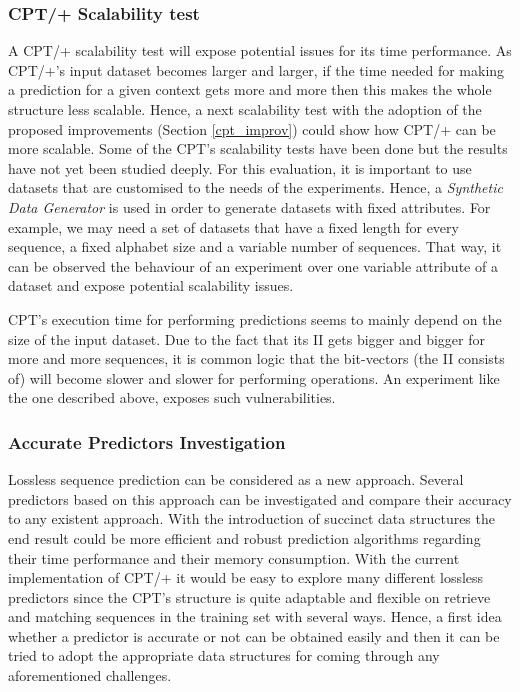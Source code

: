 \subsubsection{CPT/+ Scalability test}
A CPT/+ scalability test will expose potential issues for its time performance. As CPT/+'s input dataset becomes larger and larger, if the time needed for making a prediction for a given context gets more and more then this makes the whole structure less scalable. Hence, a next scalability test with the adoption of the proposed improvements (Section \ref{cpt_improv}) could show how CPT/+ can be more scalable. Some of the CPT's scalability tests have been done but the results have not yet been studied deeply. For this evaluation, it is important to use datasets that are customised to the needs of the experiments. Hence, a \emph{Synthetic Data Generator} is used in order to generate datasets with fixed attributes. For example, we may need a set of datasets that have a fixed length for every sequence, a fixed alphabet size and a variable number of sequences. That way, it can be observed the behaviour of an experiment over one variable attribute of a dataset and expose potential scalability issues. \par CPT's execution time for performing predictions seems to mainly depend on the size of the input dataset. Due to the fact that its II gets bigger and bigger for more and more sequences, it is common logic that the bit-vectors (the II consists of) will become slower and slower for performing operations. An experiment like the one described above, exposes such vulnerabilities.
\subsubsection{Accurate Predictors Investigation}
Lossless sequence prediction can be considered as a new approach. Several predictors based on this approach can be investigated and compare their accuracy to any existent approach. With the introduction of succinct data structures the end result could be more efficient and robust prediction algorithms regarding their time performance and their memory consumption. With the current implementation of CPT/+ it would be easy to explore many different lossless predictors since the CPT's structure is quite adaptable and flexible on retrieve and matching sequences in the training set with several ways. Hence, a first idea whether a predictor is accurate or not can be obtained easily and then it can be tried to adopt the appropriate data structures for coming through any aforementioned challenges. 
